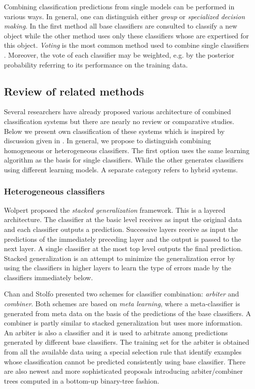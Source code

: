 \documentclass{article}
\begin{document}
Combining classification predictions from single models can be
performed in various ways. In general, one can distinguish either
{\em group} or {\em specialized decision making}. In the first
method all base classifiers are consulted to classify a new object
while the other method uses only these classifiers whose are
expertised for this object. {\em Voting} is the most common method
used to combine single classifiers \cite{Lit}. Moreover, the vote
of each classifier may be weighted, e.g. by the posterior
probability referring to its performance on the training data.

\subsection{Review of related methods}

Several researchers have already proposed various architecture of combined
classification systems but there are nearly no review or comparative
studies. Below we present own classification of these systems which is
inspired by discussion given in \cite{Gama}. In general, we propose to
distinguish combining homogeneous or heterogeneous classifiers. The first
option uses the same learning algorithm as the basis for single classifiers.
While the other generates classifiers using different learning models. A
separate category refers to hybrid systems.

\subsubsection{Heterogeneous classifiers}


Wolpert \cite{Wolpert} proposed the {\em stacked generalization} framework.
This is a layered architecture. The classifier at the basic level receives
as input the original data and each classifier outputs a prediction.
Successive layers receive as input the predictions of the immediately
preceding layer and the output is passed to the next layer. A single
classifier at the most top level outputs the final prediction. Stacked
generalization is an attempt to minimize the generalization error by using
the classifiers in higher layers to learn the type of errors made by the
classifiers immediately below.\newline


Chan and Stolfo \cite{CS93} presented two schemes for classifier
combination: {\em arbiter} and {\em combiner}. Both schemes are
based on {\em meta learning}, where a meta-classifier is generated
from meta data on the basis of the predictions of the base
classifiers. A combiner is partly similar to  stacked
generalization but uses more information. An arbiter is also a
classifier and it is used to arbitrate among predictions generated
by different base classifiers. The training set for the arbiter is
obtained from all the available data using a special selection
rule that identify examples whose classification cannot be
predicted consistently using base classifier. There are also
newest and more sophisticated proposals introducing
arbiter/combiner trees computed in a bottom-up binary-tree
fashion.
\end{document}

